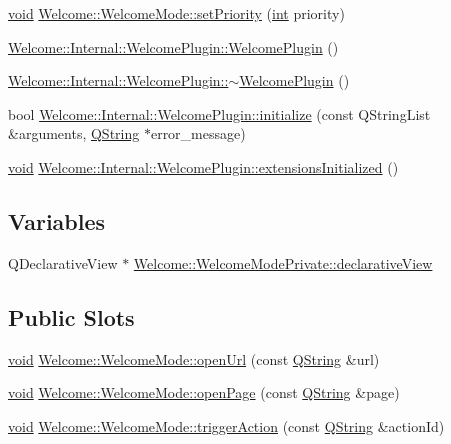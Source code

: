 \begin{DoxyCompactItemize}
\hyperlink{group___u_a_v_objects_plugin_ga444cf2ff3f0ecbe028adce838d373f5c}{void} \hyperlink{group___welcome_plugin_ga5e3a43a28b1cf87122fbb4a8872acb69}{Welcome\-::\-Welcome\-Mode\-::set\-Priority} (\hyperlink{ioapi_8h_a787fa3cf048117ba7123753c1e74fcd6}{int} priority)
\item 
\hyperlink{group___welcome_plugin_gacfac7b166995a1d17463cee3c3f9ba83}{Welcome\-::\-Internal\-::\-Welcome\-Plugin\-::\-Welcome\-Plugin} ()
\item 
\hyperlink{group___welcome_plugin_ga5b42a68f1e63d6cbac39b81ee1b809ff}{Welcome\-::\-Internal\-::\-Welcome\-Plugin\-::$\sim$\-Welcome\-Plugin} ()
\item 
bool \hyperlink{group___welcome_plugin_gaf4200dea591acb8135c4f4e8e6b42c52}{Welcome\-::\-Internal\-::\-Welcome\-Plugin\-::initialize} (const Q\-String\-List \&arguments, \hyperlink{group___u_a_v_objects_plugin_gab9d252f49c333c94a72f97ce3105a32d}{Q\-String} $\ast$error\-\_\-message)
\item 
\hyperlink{group___u_a_v_objects_plugin_ga444cf2ff3f0ecbe028adce838d373f5c}{void} \hyperlink{group___welcome_plugin_gac1e50ee0aacda1d9e1b3bc829d0d4014}{Welcome\-::\-Internal\-::\-Welcome\-Plugin\-::extensions\-Initialized} ()
\end{DoxyCompactItemize}
\subsection*{Variables}
\begin{DoxyCompactItemize}
\item 
Q\-Declarative\-View $\ast$ \hyperlink{group___welcome_plugin_gaf068be1c7d6cf926c50641b99392b563}{Welcome\-::\-Welcome\-Mode\-Private\-::declarative\-View}
\end{DoxyCompactItemize}
\subsection*{Public Slots}
\begin{DoxyCompactItemize}
\item 
\hyperlink{group___u_a_v_objects_plugin_ga444cf2ff3f0ecbe028adce838d373f5c}{void} \hyperlink{group___welcome_plugin_ga7c451e1e31c9e70b1ba15be45ac25177}{Welcome\-::\-Welcome\-Mode\-::open\-Url} (const \hyperlink{group___u_a_v_objects_plugin_gab9d252f49c333c94a72f97ce3105a32d}{Q\-String} \&url)
\item 
\hyperlink{group___u_a_v_objects_plugin_ga444cf2ff3f0ecbe028adce838d373f5c}{void} \hyperlink{group___welcome_plugin_gac98c3a91d41a1a3c391d5a4d1fd8ab92}{Welcome\-::\-Welcome\-Mode\-::open\-Page} (const \hyperlink{group___u_a_v_objects_plugin_gab9d252f49c333c94a72f97ce3105a32d}{Q\-String} \&page)
\item 
\hyperlink{group___u_a_v_objects_plugin_ga444cf2ff3f0ecbe028adce838d373f5c}{void} \hyperlink{group___welcome_plugin_gabf623de0434e61036632f9a4dd3f06d3}{Welcome\-::\-Welcome\-Mode\-::trigger\-Action} (const \hyperlink{group___u_a_v_objects_plugin_gab9d252f49c333c94a72f97ce3105a32d}{Q\-String} \&action\-Id)
\end{DoxyCompactItemize}


